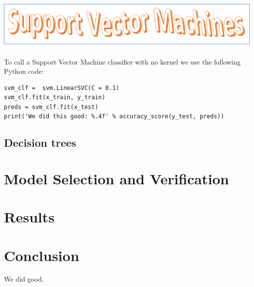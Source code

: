 \documentclass[parskip=half]{scrartcl}
\theoremstyle{definition}
\theoremstyle{remark}
\begin{document}
\subsection{\protect\includegraphics{svmheading.png}}

To call a Support Vector Machine classifier with no kernel we use the following Python code:
\begin{verbatim}
svm_clf =  svm.LinearSVC(C = 0.1)
svm_clf.fit(x_train, y_train)
preds = svm_clf.fit(x_test)
print('We did this good: %.4f' % accuracy_score(y_test, preds))
\end{verbatim}

\subsection{Decision trees}

\section{Model Selection and Verification}

\section{Results} \label{sec:results}

\section{Conclusion} \label{sec:conclusion}

We did good.


\end{document}
